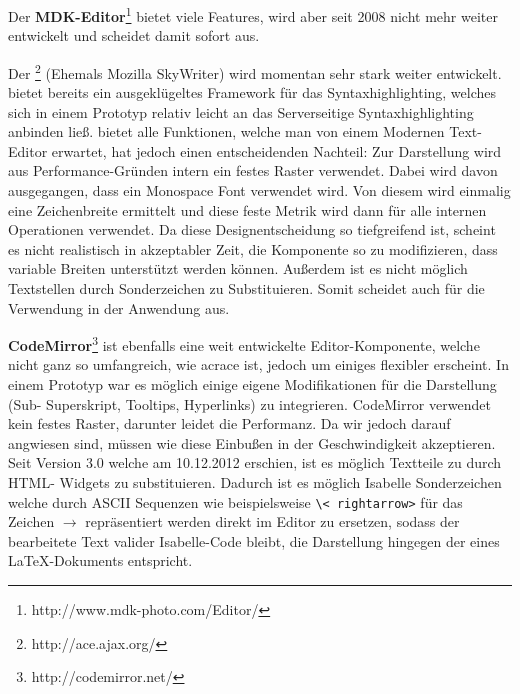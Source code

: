 \begin{description} 

\item {Der \textbf{MDK-Editor}\footnote{http://www.mdk-photo.com/Editor/}} bietet viele Features,
wird aber seit 2008 nicht mehr weiter entwickelt und scheidet damit sofort aus.

\item {Der \textbf{}\footnote{http://ace.ajax.org/}} (Ehemals Mozilla SkyWriter) wird
momentan sehr stark weiter entwickelt.  bietet bereits ein ausgeklügeltes Framework für das
Syntaxhighlighting, welches sich in einem Prototyp relativ leicht an das Serverseitige
Syntaxhighlighting anbinden ließ.  bietet alle Funktionen, welche man von einem Modernen
Text-Editor erwartet, hat jedoch einen entscheidenden Nachteil: Zur Darstellung wird aus
Performance-Gründen intern ein festes Raster verwendet. Dabei wird davon ausgegangen, dass ein
Monospace Font verwendet wird. Von diesem wird einmalig eine Zeichenbreite ermittelt und diese feste
Metrik wird dann für alle internen Operationen verwendet. Da diese Designentscheidung so
tiefgreifend ist, scheint es nicht realistisch in akzeptabler Zeit, die Komponente so zu
modifizieren, dass variable Breiten unterstützt werden können. Außerdem ist es nicht möglich
Textstellen durch Sonderzeichen zu Substituieren. Somit scheidet auch  für die Verwendung
in der Anwendung aus.

\item {\textbf{CodeMirror}\footnote{http://codemirror.net/}} ist ebenfalls eine weit entwickelte
Editor-Komponente, welche nicht ganz so umfangreich, wie acr{ace} ist, jedoch um einiges flexibler
erscheint. In einem Prototyp war es möglich einige eigene Modifikationen für die Darstellung (Sub-
Superskript, Tooltips, Hyperlinks) zu integrieren. CodeMirror verwendet kein festes Raster, darunter
leidet die Performanz. Da wir jedoch darauf angwiesen sind, müssen wie diese Einbußen in der
Geschwindigkeit akzeptieren. Seit Version 3.0 welche am 10.12.2012 erschien, ist es möglich
Textteile zu durch HTML- Widgets zu substituieren. Dadurch ist es möglich Isabelle Sonderzeichen
welche durch ASCII Sequenzen wie beispielsweise \texttt{\textbackslash\textless
rightarrow\textgreater} für das Zeichen $\rightarrow$ repräsentiert werden direkt im Editor zu
ersetzen, sodass der bearbeitete Text valider Isabelle-Code bleibt, die Darstellung hingegen der
eines LaTeX-Dokuments entspricht.

\end{description}

